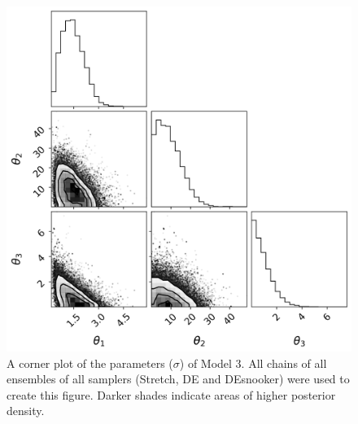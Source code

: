 \begin{figure}[ht]
\centering
\includegraphics[width=\textwidth]{Figures/appendix_figs/C1.4 corner plot Model 3.png}
\caption{A corner plot of the parameters ($\sigma$) of Model 3. All chains of all ensembles of all samplers (Stretch, DE and DEsnooker) were used to create this figure. Darker shades indicate areas of higher posterior density.}\label{fig_logbook_1.4_corner_model3}
\end{figure}

